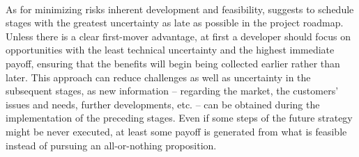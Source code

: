 \documentclass[twoside]{report}
\begin{document}
\paragraph{}
As for minimizing risks inherent development and feasibility, \cite{tiwana_platform_2014} suggests to schedule stages with the greatest uncertainty as late as possible in the project roadmap. Unless there is a clear first-mover advantage, at first a developer should focus on opportunities with the least technical uncertainty and the highest immediate payoff, ensuring that the benefits will begin being collected earlier rather than later. This approach can reduce challenges as well as uncertainty in the subsequent stages, as new information – regarding the market, the customers' issues and needs, further developments, etc. – can be obtained during the implementation of the preceding stages. Even if some steps of the future strategy might be never executed, at least some payoff is generated from what is feasible instead of pursuing an all-or-nothing proposition.
\end{document}
